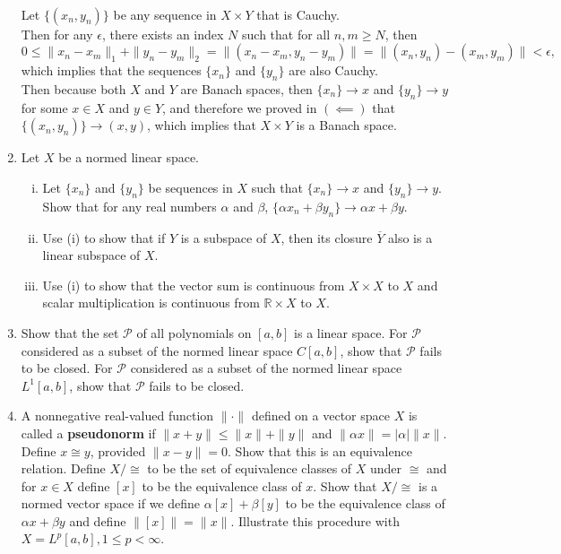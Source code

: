 \begin{enumerate}
    \\Let $\{(x_n,y_n)\}$ be any sequence in $X\times Y$ that is Cauchy.
    \\Then for any $\epsilon$, there exists an index $N$ such that for all $n,m\ge N$, then
    \[
        0\le\|x_n-x_m\|_1+\|y_n-y_m\|_2=\|(x_n-x_m,y_n-y_m)\|=\|(x_n,y_n)-(x_m,y_m)\|<\epsilon,
    \]
    which implies that the sequences $\{x_n\}$ and $\{y_n\}$ are also Cauchy.
    \\Then because both $X$ and $Y$ are Banach spaces, then $\{x_n\}\to x$ and $\{y_n\}\to y$ for some $x\in X$ and $y\in Y$, and therefore we proved in $(\impliedby)$ that $\{(x_n,y_n)\}\to(x,y)$, which implies that $X\times Y$ is a Banach space.
    \item Let $X$ be a normed linear space.
    \begin{enumerate}[(i)]
        \item Let $\{x_n\}$ and $\{y_n\}$ be sequences in $X$ such that $\{x_n\}\to x$ and $\{y_n\}\to y$.
        Show that for any real numbers $\alpha$ and $\beta$, $\{\alpha x_n+\beta y_n\}\to\alpha x+\beta y$.
        \item Use (i) to show that if $Y$ is a subspace of $X$, then its closure $\overline{Y}$ also is a linear subspace of $X$.
        \item Use (i) to show that the vector sum is continuous from $X\times X$ to $X$ and scalar multiplication is continuous from $\mathbb{R}\times X$ to $X$.
    \end{enumerate} 
    \item Show that the set $\mathcal{P}$ of all polynomials on $[a,b]$ is a linear space.
    For $\mathcal{P}$ considered as a subset of the normed linear space $C[a,b]$, show that $\mathcal{P}$ fails to be closed.
    For $\mathcal{P}$ considered as a subset of the normed linear space $L^1[a,b]$, show that $\mathcal{P}$ fails to be closed.
    \item A nonnegative real-valued function $\|\cdot\|$ defined on a vector space $X$ is called a \textbf{pseudonorm} if $\|x+y\|\le\|x\|+\|y\|$ and $\|\alpha x\|=|\alpha|\|x\|$.
    Define $x\cong y$, provided $\|x-y\|=0$.
    Show that this is an equivalence relation.
    Define $X/\cong$ to be the set of equivalence classes of $X$ under $\cong$ and for $x\in X$ define $[x]$ to be the equivalence class of $x$.
    Show that $X/\cong$ is a normed vector space if we define $\alpha[x]+\beta[y]$ to be the equivalence class of $\alpha x+\beta y$ and define $\|[x]\|=\|x\|$.
    Illustrate this procedure with $X=L^p[a,b],1\le p<\infty$.
\end{enumerate}

